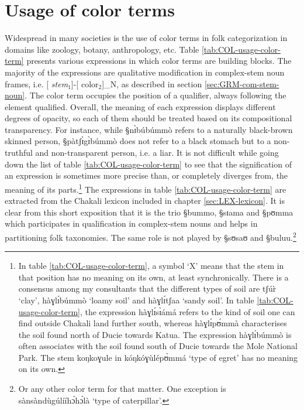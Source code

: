 
\section{Usage of color terms}
\label{sec:COL-usage}

Widespread in many societies is the use of color terms in folk
categorization in domains like  zoology, botany, anthropology, etc.
Table 
\ref{tab:COL-usage-color-term} presents various expressions in which color
terms are building blocks. The majority of the expressions  are
qualitative modification in complex-stem noun frames, i.e.  [{\it
stem}$_{1}$]-[{\sc
color}$_{2}$]_{N},  as described in section \ref{sec:GRM-com-stem-noun}.  The
color
term occupies the position of a qualifier, always following the element
qualified. Overall, the meaning of each expression displays different degrees of
opacity, so each of them should be treated  based on its compositional 
transparency. For instance, while {\S nɪ̀búbúmmò}  refers to a
naturally black-brown skinned person,  {\S  pàtʃɪ̀gɪ̀búmmò} does not refer to
a black stomach  but to a non-truthful and non-transparent person, i.e. a liar.
It is not difficult while going down the list of table 
\ref{tab:COL-usage-color-term}  to see that the signification of an expression
is sometimes more precise than, or completely diverges from,  the meaning of its
parts.\footnote{In table \ref{tab:COL-usage-color-term}, a symbol `X' means
that the stem in that position has no meaning on its own, at least
synchronically. There is a consensus among my consultants that the different
types of soil are {\F tʃúr̀} `clay', {\F hàɣlɪ́búmmò} `loamy soil' and {\F
hàɣlɪ́tʃaa} `sandy soil'. In table \ref{tab:COL-usage-color-term},  the
expression {\F hàɣlɪ́sɪ̀ámá}  refers to the kind of soil one can find outside
Chakali land further south, whereas 
{\F hàɣlɪ́pʊ́mmà}  characterises the soil found north of Ducie towards Katua. 
 The expression {\F hàɣlɪ́búmmò} is often associates with the soil found
south of Ducie towards the Mole National Park.  The stem {\F koŋkoɣule} in
{\F kóŋkóɣùlépʊ̀mmá}  `type of egret' has no meaning on its own.} The
expressions in table \ref{tab:COL-usage-color-term} are extracted from the
Chakali
lexicon included in chapter \ref{sec:LEX-lexicon}. It is clear from this short
exposition that it is the trio  {\S bummo}, {\S sɪama} and  {\S pʊmma} which
participates in qualification in complex-stem nouns and helps in
partitioning folk  taxonomies. The same role is not played
by  {\S sʊsaʊ} and {\S buluu}.\footnote{Or any other color term for that matter.
One
exception is   {\F  sànsàndùgúlííhɔ́hɔ́là}  `type of
caterpillar'.}




